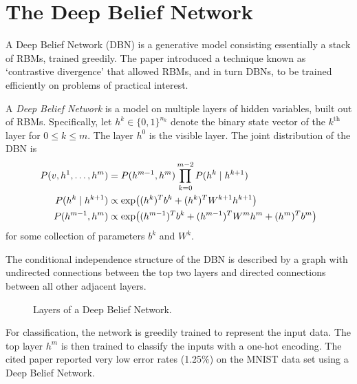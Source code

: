 \documentclass[cclicense]{hmcthesis}
\numberwithin{equation}{section}
\begin{document}
\section{The Deep Belief Network}
    A Deep Belief Network (DBN) is a generative model consisting essentially a
    stack of RBMs, trained greedily.  The paper \citep{Hin07} introduced a
    technique known as `contrastive divergence' that allowed RBMs, and in turn
    DBNs, to be trained efficiently on problems of practical interest.
    \begin{definition}
    A \emph{Deep Belief Network} is a model on multiple layers of hidden
    variables, built out of RBMs.  Specifically, let $h^k \in \{0,1\}^{n_k}$
    denote the binary state vector of the $k^{\text{th}}$ layer for $0 \le k \le
    m$.  The layer $h^0$ is the visible layer.  The joint distribution of the
    DBN is
    \begin{align*}
        P(v,h^1, \ldots, h^m) &= P(h^{m-1}, h^m) \prod_{k=0}^{m-2} P(h^k \mid h^{k+1})\\
        P(h^k\mid h^{k+1}) &\propto \exp\pdel*{(h^k)^Tb^k + (h^k)^T W^{k+1} h^{k+1}}\\
        P(h^{m-1}, h^{m}) &\propto  \exp\pdel*{(h^{m-1})^T b^k + (h^{m-1})^T W^m
        h^m + (h^m)^T b^m}
    \end{align*}
    for some collection of parameters $b^k$ and $W^k$.
    \end{definition}

    The conditional independence structure of the DBN is described by a graph
    with undirected connections between the top two layers and directed
    connections between all other adjacent layers.
    \begin{figure}[H]
        \centering
        \caption{Layers of a Deep Belief Network.}
    \end{figure}
    \noindent For classification, the network is greedily trained to represent
    the input data.  The top layer $h^m$ is then trained to classify the inputs
    with a one-hot encoding.  The cited paper reported very low error rates
    (1.25\%) on the MNIST data set using a Deep Belief Network.





\printindex

\backmatter
\end{document}
